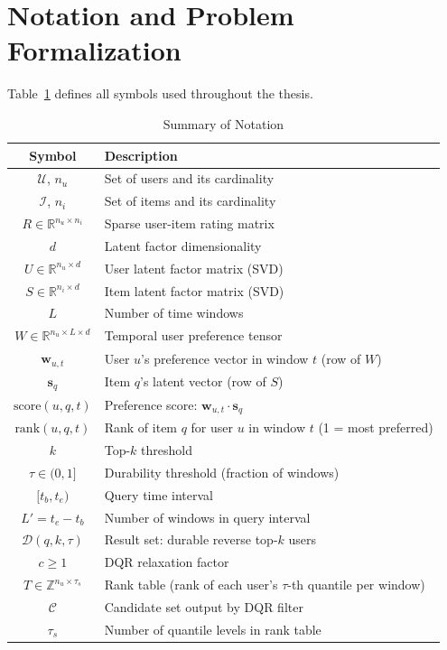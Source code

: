 \section{Notation and Problem Formalization}

Table~\ref{tab:notation} defines all symbols used throughout the thesis.

\begin{table}[htbp]
\centering
\caption{Summary of Notation}
\label{tab:notation}
\begin{tabular}{cl}
\toprule
\textbf{Symbol} & \textbf{Description} \\
\midrule
$\mathcal{U}$, $n_u$ & Set of users and its cardinality \\
$\mathcal{I}$, $n_i$ & Set of items and its cardinality \\
$R \in \mathbb{R}^{n_u \times n_i}$ & Sparse user-item rating matrix \\
$d$ & Latent factor dimensionality \\
$U \in \mathbb{R}^{n_u \times d}$ & User latent factor matrix (SVD) \\
$S \in \mathbb{R}^{n_i \times d}$ & Item latent factor matrix (SVD) \\
$L$ & Number of time windows \\
$W \in \mathbb{R}^{n_u \times L \times d}$ & Temporal user preference tensor \\
$\mathbf{w}_{u,t}$ & User $u$'s preference vector in window $t$ (row of $W$) \\
$\mathbf{s}_q$ & Item $q$'s latent vector (row of $S$) \\
$\text{score}(u, q, t)$ & Preference score: $\mathbf{w}_{u,t} \cdot \mathbf{s}_q$ \\
$\text{rank}(u, q, t)$ & Rank of item $q$ for user $u$ in window $t$ (1 = most preferred) \\
$k$ & Top-$k$ threshold \\
$\tau \in (0,1]$ & Durability threshold (fraction of windows) \\
$[t_b, t_e)$ & Query time interval \\
$L' = t_e - t_b$ & Number of windows in query interval \\
$\mathcal{D}(q, k, \tau)$ & Result set: durable reverse top-$k$ users \\
$c \geq 1$ & DQR relaxation factor \\
$T \in \mathbb{Z}^{n_u \times \tau_s}$ & Rank table (rank of each user's $\tau$-th quantile per window) \\
$\mathcal{C}$ & Candidate set output by DQR filter \\
$\tau_s$ & Number of quantile levels in rank table \\
\bottomrule
\end{tabular}
\end{table}

